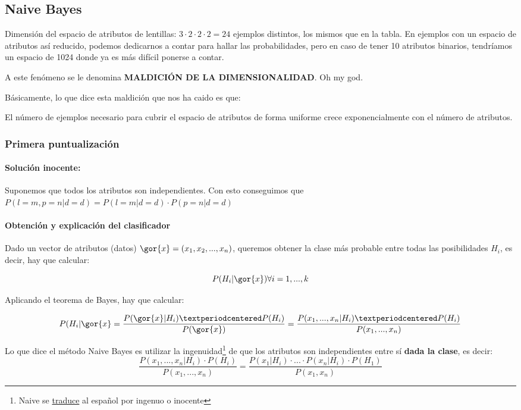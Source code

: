\documentclass{apuntes}
\begin{document}
\subsection{Naive Bayes}

Dimensión del espacio de atributos de lentillas: $3·2·2·2 = 24$ ejemplos distintos, los mismos que en la tabla. En ejemplos con un espacio de atributos así reducido, podemos dedicarnos a contar para hallar las probabilidades, pero en caso de tener 10 atributos binarios, tendríamos un espacio de 1024 donde ya es más difícil ponerse a contar.

A este fenómeno se le denomina \textbf{MALDICIÓN DE LA DIMENSIONALIDAD}. Oh my god.

\begin{defn}
Básicamente, lo que dice esta maldición que nos ha caido es que:

El número de ejemplos necesario para cubrir el espacio de atributos de forma uniforme crece exponencialmente con el número de atributos.
\end{defn}

\subsubsection{Primera puntualización}
\paragraph{Solución inocente: } Suponemos que todos los atributos son independientes. Con esto conseguimos que $P(l=m,p=n | d=d) = P(l=m | d=d)·P(p=n | d=d)$

\paragraph{Obtención y explicación del clasificador}


Dado un vector de atributos (datos) $\gor{x} = (x_1,x_2,...,x_n)$, queremos obtener la clase más probable entre todas las posibilidades $H_i$, es decir, hay que calcular:

\[
P(H_i | \gor{x}) \forall i=1,...,k
\]

Aplicando el teorema de Bayes, hay que calcular:

\[
P(H_i|\gor{x} = \frac{P(\gor{x}|H_i)·P(H_i)}{P(\gor{x})} = \frac{P(x_1,...,x_n | H_i) · P(H_i)}{P(x_1,...,x_n)}
\]


Lo que dice el método Naive Bayes es utilizar la ingenuidad\footnote{Naive se \href{http://www.wordreference.com/es/translation.asp?tranword=Naive}{traduce} al español por ingenuo o inocente}  de que los atributos son independientes entre sí \textbf{dada la clase}, es decir: \[\frac{P(x_1,...,x_n | H_i) · P(H_i)}{P(x_1,...,x_n)} = \frac{P(x_1|H_i)·...·P(x_n|H_i) · P(H_1)}{P(x_1,x_n)}\]
\end{document}
